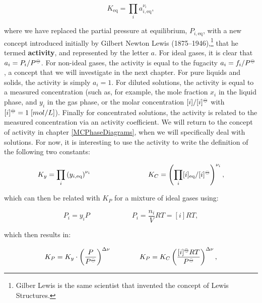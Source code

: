 \documentclass[
  9pt,
]{extbook}
\theoremstyle{definition}
\theoremstyle{definition}
\theoremstyle{definition}
\theoremstyle{definition}
\theoremstyle{remark}
\begin{document}
\begin{equation}
K_{\text{eq}} =\prod_i a_{i,\text{eq}}^{\nu_i},
\label{eq:kdef}
\end{equation}

where we have replaced the partial pressure at equilibrium, \(P_{i,\text{eq}}\), with a new concept introduced initially by Gilbert Newton Lewis (1875--1946),\footnote{Gilber Lewis is the same scientist that invented the concept of Lewis Structures.} that he termed \textbf{activity}, and represented by the letter \(a\). For ideal gases, it is clear that \(a_i=P_i/P^{-\kern-6pt{\ominus}\kern-6pt-}\). For non-ideal gases, the activity is equal to the fugacity \(a_i=f_i/P^{-\kern-6pt{\ominus}\kern-6pt-}\), a concept that we will investigate in the next chapter. For pure liquids and solids, the activity is simply \(a_i=1\). For diluted solutions, the activity is equal to a measured concentration (such as, for example, the mole fraction \(x_i\) in the liquid phase, and \(y_i\) in the gas phase, or the molar concentration \([i]/[i]^{-\kern-6pt{\ominus}\kern-6pt-}\) with \([i]^{-\kern-6pt{\ominus}\kern-6pt-}= 1\;\text[mol/L]\)). Finally for concentrated solutions, the activity is related to the measured concentration via an activity coefficient. We will return to the concept of activity in chapter \ref{MCPhaseDiagrams}, when we will specifically deal with solutions. For now, it is interesting to use the activity to write the definition of the following two constants:

\begin{equation}
K_y =\prod_i \left( y_{i,\text{eq}} \right)^{\nu_i} \qquad \qquad \qquad \qquad K_C =\left( \prod_i [i]_{\text{eq}}/[i]^{-\kern-6pt{\ominus}\kern-6pt-}\right)^{\nu_i},
\label{eq:kxkcdef}
\end{equation}

which can then be related with \(K_P\) for a mixture of ideal gases using:

\begin{equation}
P_i = y_i P \qquad \qquad \qquad P_i=\frac{n_i}{V}RT=[i]RT,
\label{eq:kxkcdef2}
\end{equation}

which then results in:

\begin{equation}
K_P = K_y\cdot \left(\frac{P}{P^{-\kern-6pt{\ominus}\kern-6pt-}}\right)^{\Delta \nu} \qquad \qquad K_P = K_C \left( \frac{[i]^{-\kern-6pt{\ominus}\kern-6pt-}RT}{P^{-\kern-6pt{\ominus}\kern-6pt-}} \right)^{\Delta \nu},
\label{eq:kxkcdef3}
\end{equation}
\end{document}
